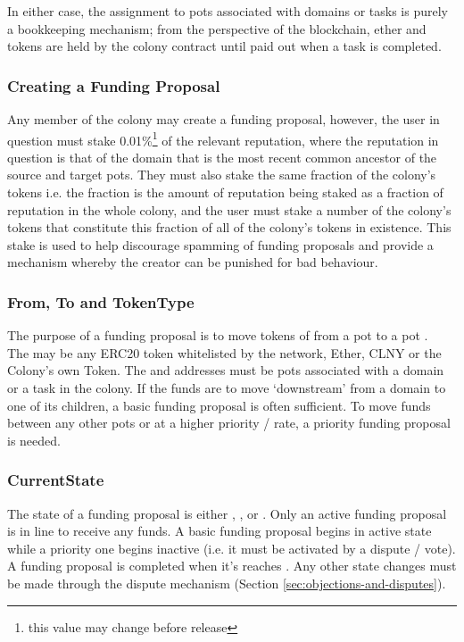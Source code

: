 In either case, the assignment to pots associated with domains or tasks is purely a bookkeeping mechanism; from the perspective of the blockchain, ether and tokens are held by the colony contract until paid out when a task is completed. 

\subsubsection*{Creating a Funding Proposal}
Any member of the colony may create a funding proposal, however, the user in question must stake 0.01\%\footnote{this value may change before release} of the relevant reputation, where the reputation in question is that of the domain that is the most recent common ancestor of the source and target pots. They must also stake the same fraction of the colony's tokens i.e. the fraction is the amount of reputation being staked as a fraction of reputation in the whole colony, and the user must stake a number of the colony's tokens that constitute this fraction of all of the colony's tokens in existence. This stake is used to help discourage spamming of funding proposals and provide a mechanism whereby the creator can be punished for bad behaviour. 

\subsubsection*{From, To and TokenType}
The purpose of a funding proposal is to move tokens of  from a pot  to a pot . \\
The  may be any ERC20 token whitelisted by the network, Ether, CLNY or the Colony's own Token. The  and  addresses must be pots associated with a domain or a task in the colony. If the funds are to move `downstream' from a domain to one of its children, a basic funding proposal is often sufficient. To move funds between any other pots or at a higher priority / rate, a priority funding proposal is needed.

\subsubsection*{CurrentState}
The state of a funding proposal is either , ,  or . Only an active funding proposal is in line to receive any funds. A basic funding proposal begins in active state while a priority one begins inactive (i.e. it must be activated by a dispute / vote). A funding proposal is completed when it's  reaches . Any other state changes must be made through the dispute mechanism (Section \ref{sec:objections-and-disputes}).

